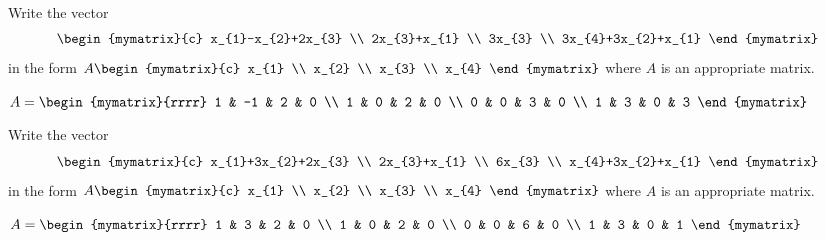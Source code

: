 \begin{enumialphparenastyle}
\begin{ex} Write the vector
  \begin{equation*}
    \begin{mymatrix}{c}
      x_{1}-x_{2}+2x_{3} \\
      2x_{3}+x_{1} \\
      3x_{3} \\
      3x_{4}+3x_{2}+x_{1}
    \end{mymatrix}
  \end{equation*}
  in the form $A\begin{mymatrix}{c}
    x_{1} \\
    x_{2} \\
    x_{3} \\
    x_{4}
  \end{mymatrix} $ where $A$ is an appropriate matrix.
  \begin{sol}
    $A=\begin{mymatrix}{rrrr}
      1 & -1 & 2 & 0 \\
      1 & 0 & 2 & 0 \\
      0 & 0 & 3 & 0 \\
      1 & 3 & 0 & 3
    \end{mymatrix} $
  \end{sol}
\end{ex}

\begin{ex} Write the vector
  \begin{equation*}
    \begin{mymatrix}{c}
      x_{1}+3x_{2}+2x_{3} \\
      2x_{3}+x_{1} \\
      6x_{3} \\
      x_{4}+3x_{2}+x_{1}
    \end{mymatrix}
  \end{equation*}
  in the form $A\begin{mymatrix}{c}
    x_{1} \\
    x_{2} \\
    x_{3} \\
    x_{4}
  \end{mymatrix} $ where $A$ is an appropriate matrix.
  \begin{sol}
    $A=\begin{mymatrix}{rrrr}
      1 & 3 & 2 & 0 \\
      1 & 0 & 2 & 0 \\
      0 & 0 & 6 & 0 \\
      1 & 3 & 0 & 1
    \end{mymatrix}$
  \end{sol}
\end{ex}

\end{enumialphparenastyle}
